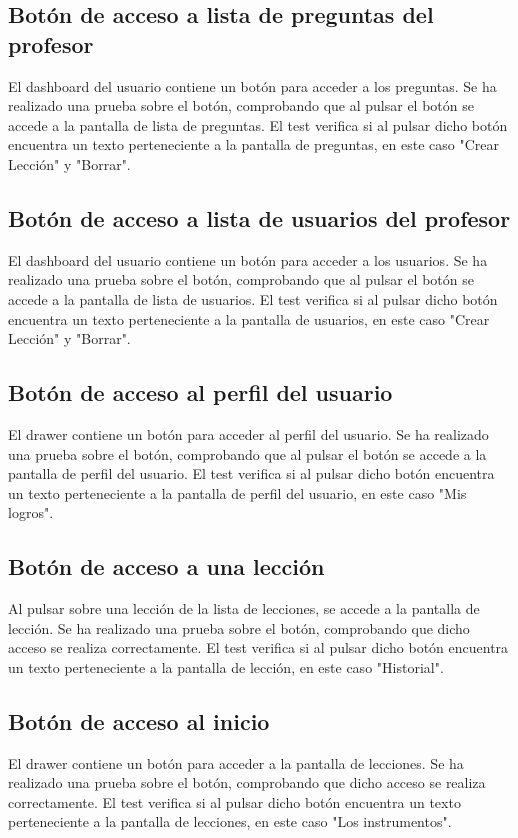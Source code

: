 \subsection{Botón de acceso a lista de preguntas del profesor}
\label{subsec:pruebas-controlador-boton-preguntas}
El dashboard del usuario contiene un botón para acceder a los preguntas. Se ha realizado una prueba sobre el botón, comprobando que al pulsar el botón se accede a la pantalla de lista de preguntas. 
El test verifica si al pulsar dicho botón encuentra un texto perteneciente a la pantalla de preguntas, en este caso "Crear Lección" y "Borrar".

\subsection{Botón de acceso a lista de usuarios del profesor}
\label{subsec:pruebas-controlador-boton-usuarios}
El dashboard del usuario contiene un botón para acceder a los usuarios. Se ha realizado una prueba sobre el botón, comprobando que al pulsar el botón se accede a la pantalla de lista de usuarios. 
El test verifica si al pulsar dicho botón encuentra un texto perteneciente a la pantalla de usuarios, en este caso "Crear Lección" y "Borrar".

\subsection{Botón de acceso al perfil del usuario}
\label{subsec:pruebas-controlador-boton-perfil-usuario}
El drawer contiene un botón para acceder al perfil del usuario. Se ha realizado una prueba sobre el botón, comprobando que al pulsar el botón se accede a la pantalla de perfil del usuario.
El test verifica si al pulsar dicho botón encuentra un texto perteneciente a la pantalla de perfil del usuario, en este caso "Mis logros".

\subsection{Botón de acceso a una lección}
\label{subsec:pruebas-controlador-boton-leccion}
Al pulsar sobre una lección de la lista de lecciones, se accede a la pantalla de lección. Se ha realizado una prueba sobre el botón, comprobando que dicho acceso se realiza correctamente.
El test verifica si al pulsar dicho botón encuentra un texto perteneciente a la pantalla de lección, en este caso "Historial".

\subsection{Botón de acceso al inicio}
\label{subsec:pruebas-controlador-boton-leccion}
El drawer contiene un botón para acceder a la pantalla de lecciones. Se ha realizado una prueba sobre el botón, comprobando que dicho acceso se realiza correctamente.
El test verifica si al pulsar dicho botón encuentra un texto perteneciente a la pantalla de lecciones, en este caso "Los instrumentos".

